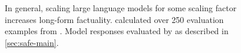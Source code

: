 \begin{figure}[ht]
\begin{centering}
    \end{centering}
    \caption{
        In general, scaling large language models for some scaling factor increases long-form factuality.
        \metric{} calculated over 250 evaluation examples from \longfactobjects{}.
        Model responses evaluated by \safe{} as described in \cref{sec:safe-main}.
    }
    \label{fig:model-family-scaling}
\end{figure}